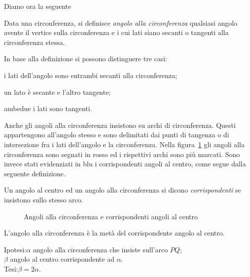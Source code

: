 Diamo ora la seguente
\begin{definizione}
Data una circonferenza, si definisce \emph{angolo alla circonferenza} qualsiasi angolo avente il vertice sulla circonferenza e i cui lati siano secanti o tangenti alla circonferenza stessa. 
\end{definizione}
In base alla definizione si possono distinguere tre casi:
\begin{itemize*}
\item i lati dell'angolo sono entrambi secanti alla circonferenza;
\item un lato è secante e l'altro tangente;
\item ambedue i lati sono tangenti.
\end{itemize*}

Anche gli angoli alla circonferenza insistono su archi di circonferenza. Questi appartengono all'angolo stesso e sono delimitati dai punti di tangenza o di intersezione fra i lati dell'angolo e la circonferenza. Nella figura~\ref{fig:ang_circonf} gli angoli alla circonferenza sono segnati in rosso ed i rispettivi archi sono più marcati. Sono invece stati evidenziati in blu i corrispondenti angoli al centro, come segue dalla seguente definizione.

\begin{definizione}
Un angolo al centro ed un angolo alla circonferenza si dicono \emph{corrispondenti} se insistono sullo stesso arco.
\end{definizione}

\begin{figure}[htb]\label{fig:ang_circonf}
	\centering
	\caption{Angoli alla circonferenza e corrispondenti angoli al centro}
\end{figure}

\begin{teorema}
L'angolo alla circonferenza è la metà del corrispondente angolo al centro.
\end{teorema}

\noindent Ipotesi:\tab $\alpha$ angolo alla circonferenza che insiste sull'arco $PQ$;\\
\tab\tab $\beta$ angolo al centro corrispondente ad $\alpha$.\vspace{4pt}\\
Tesi:\tab $\beta = 2\alpha$.



